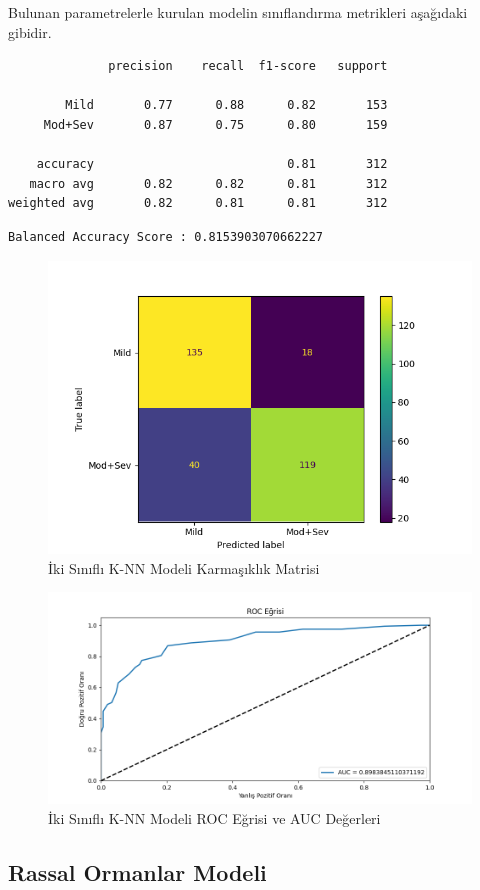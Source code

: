 \documentclass[12pt,twoside]{deuthesis}
\begin{document}
Bulunan parametrelerle kurulan modelin sınıflandırma metrikleri aşağıdaki gibidir.
\begin{verbatim}
              precision    recall  f1-score   support

        Mild       0.77      0.88      0.82       153
     Mod+Sev       0.87      0.75      0.80       159

    accuracy                           0.81       312
   macro avg       0.82      0.82      0.81       312
weighted avg       0.82      0.81      0.81       312
\end{verbatim}
\begin{verbatim}
Balanced Accuracy Score : 0.8153903070662227
\end{verbatim}
\begin{figure}

{\centering \includegraphics[width=1.05\linewidth,height=0.6\textheight]{figure/knn_bin_conf} 

}

\caption{İki Sınıflı K-NN Modeli Karmaşıklık Matrisi}\label{fig:unnamed-chunk-59}
\end{figure}
\begin{figure}

{\centering \includegraphics[width=1.05\linewidth,height=0.6\textheight]{figure/KNeighborsClassifier_binary_roc} 

}

\caption{İki Sınıflı K-NN Modeli ROC Eğrisi ve AUC Değerleri}\label{fig:unnamed-chunk-60}
\end{figure}
\hypertarget{bin_rf}{%
\subsection{Rassal Ormanlar Modeli}\label{bin_rf}}
\end{document}
